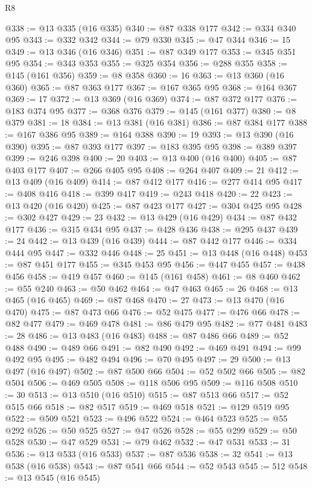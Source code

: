 \begin{lexlean}{R8}
\begin{coremodule}
@338 := @13 @335 (@16 @335)
@340 := @87 @338 @177
@342 := @334 @340 @95
@343 := @332 @342
@344 := @79 @330
@345 := @47 @344
@346 := 15
@349 := @13 @346 (@16 @346)
@351 := @87 @349 @177
@353 := @345 @351 @95
@354 := @343 @353
@355 := @325 @354
@356 := @288 @355
@358 := @145 (@161 @356)
@359 := @8 @358
@360 := 16
@363 := @13 @360 (@16 @360)
@365 := @87 @363 @177
@367 := @167 @365 @95
@368 := @164 @367
@369 := 17
@372 := @13 @369 (@16 @369)
@374 := @87 @372 @177
@376 := @183 @374 @95
@377 := @368 @376
@379 := @145 (@161 @377)
@380 := @8 @379
@381 := 18
@384 := @13 @381 (@16 @381)
@386 := @87 @384 @177
@388 := @167 @386 @95
@389 := @164 @388
@390 := 19
@393 := @13 @390 (@16 @390)
@395 := @87 @393 @177
@397 := @183 @395 @95
@398 := @389 @397
@399 := @246 @398
@400 := 20
@403 := @13 @400 (@16 @400)
@405 := @87 @403 @177
@407 := @266 @405 @95
@408 := @264 @407
@409 := 21
@412 := @13 @409 (@16 @409)
@414 := @87 @412 @177
@416 := @277 @414 @95
@417 := @408 @416
@418 := @399 @417
@419 := @243 @418
@420 := 22
@423 := @13 @420 (@16 @420)
@425 := @87 @423 @177
@427 := @304 @425 @95
@428 := @302 @427
@429 := 23
@432 := @13 @429 (@16 @429)
@434 := @87 @432 @177
@436 := @315 @434 @95
@437 := @428 @436
@438 := @295 @437
@439 := 24
@442 := @13 @439 (@16 @439)
@444 := @87 @442 @177
@446 := @334 @444 @95
@447 := @332 @446
@448 := 25
@451 := @13 @448 (@16 @448)
@453 := @87 @451 @177
@455 := @345 @453 @95
@456 := @447 @455
@457 := @438 @456
@458 := @419 @457
@460 := @145 (@161 @458)
@461 := @8 @460
@462 := @55 @240
@463 := @50 @462
@464 := @47 @463
@465 := 26
@468 := @13 @465 (@16 @465)
@469 := @87 @468
@470 := 27
@473 := @13 @470 (@16 @470)
@475 := @87 @473 @66
@476 := @52 @475
@477 := @476 @66
@478 := @82 @477
@479 := @469 @478
@481 := @86 @479 @95
@482 := @77 @481
@483 := 28
@486 := @13 @483 (@16 @483)
@488 := @87 @486 @66
@489 := @52 @488
@490 := @489 @66
@491 := @82 @490
@492 := @469 @491
@494 := @99 @492 @95
@495 := @482 @494
@496 := @70 @495
@497 := 29
@500 := @13 @497 (@16 @497)
@502 := @87 @500 @66
@504 := @52 @502 @66
@505 := @82 @504
@506 := @469 @505
@508 := @118 @506 @95
@509 := @116 @508
@510 := 30
@513 := @13 @510 (@16 @510)
@515 := @87 @513 @66
@517 := @52 @515 @66
@518 := @82 @517
@519 := @469 @518
@521 := @129 @519 @95
@522 := @509 @521
@523 := @496 @522
@524 := @464 @523
@525 := @55 @292
@526 := @50 @525
@527 := @47 @526
@528 := @55 @299
@529 := @50 @528
@530 := @47 @529
@531 := @79 @462
@532 := @47 @531
@533 := 31
@536 := @13 @533 (@16 @533)
@537 := @87 @536
@538 := 32
@541 := @13 @538 (@16 @538)
@543 := @87 @541 @66
@544 := @52 @543
@545 := 512
@548 := @13 @545 (@16 @545)

\end{coremodule}
\end{lexlean}
